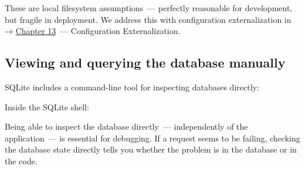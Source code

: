 \noindent{}These are local filesystem assumptions~--- perfectly reasonable for development, but fragile in deployment. We address this with configuration externalization in → \hyperref[ch:13-configuration-externalization]{Chapter 13}~--- Configuration Externalization.

\subsection*{Viewing and querying the database manually}\label{06-local-dependencies:viewing-and-querying-the-database-manually}

SQLite includes a command-line tool for inspecting databases directly:

\begin{codebox}[short]

\begin{Shaded}
\begin{Highlighting}[]
\end{Highlighting}
\end{Shaded}

\end{codebox}

\noindent{}Inside the SQLite shell:

\begin{codebox}[short]

\begin{Shaded}
\begin{Highlighting}[]

\CommentTok{{-}{-} );}

 \OperatorTok{*} 

\end{Highlighting}
\end{Shaded}

\end{codebox}

\noindent{}Being able to inspect the database directly~--- independently of the application~--- is essential for debugging. If a request seems to be failing, checking the database state directly tells you whether the problem is in the database or in the code.

